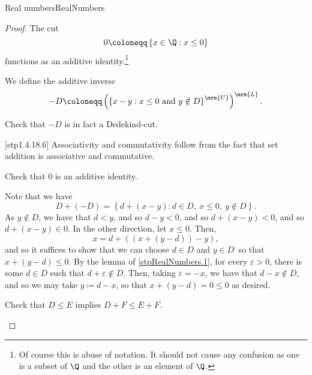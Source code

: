 \begin{thm}{Real numbers}{RealNumbers}
\begin{proof}
The cut
\begin{equation}
0\coloneqq \left\{ x\in \Q :x\leq 0\right\}
\end{equation}
functions as an additive identity.\footnote{Of course this is abuse of notation.  It should not cause any confusion as one is a subset of $\Q$ and the other is an element of $\Q$.}

We define the additive inverse
\begin{equation}
-D\coloneqq \left( \left\{ x-y:x\leq 0\text{ and }y\notin D\right\} ^{\mrm{U}}\right) ^{\mrm{L}}.
\end{equation}
\begin{exr}[breakable=false]{}{}
Check that $-D$ is in fact a Dedekind-cut.
\end{exr}

[stp1.4.18.6]
Associativity and commutativity follow from the fact that set addition is associative and commutative.
\begin{exr}[breakable=false]{}{}
Check that $0$ is an additive identity.
\end{exr}
Note that we have
\begin{equation*}
D+(-D)=\left\{ d+(x-y):d\in D,\ x\leq 0,\ y\notin D\right\} .
\end{equation*}
As $y\notin D$, we have that $d<y$, and so $d-y<0$, and so $d+(x-y)<0$, and so $d+(x-y)\in 0$.  In the other direction, let $x\leq 0$.  Then,
\begin{equation}
x=d+\left( \left( x+(y-d)\right) -y\right) ,
\end{equation}
and so it suffices to show that we can choose $d\in D$ and $y\in D^{\comp}$ so that $x+(y-d)\leq 0$.  By the lemma of \cref{stpRealNumbers.1}, for every $\varepsilon >0$, there is some $d\in D$ such that $d+\varepsilon \notin D$.  Then, taking $\varepsilon =-x$, we have that $d-x\notin D$, and so we may take $y\coloneqq d-x$, so that $x+(y-d)=0\leq 0$ as desired.

\begin{exr}[breakable=false]{}{}
Check that $D\leq E$ implies $D+F\leq E+F$.
\end{exr}


\end{proof}
\end{thm}
